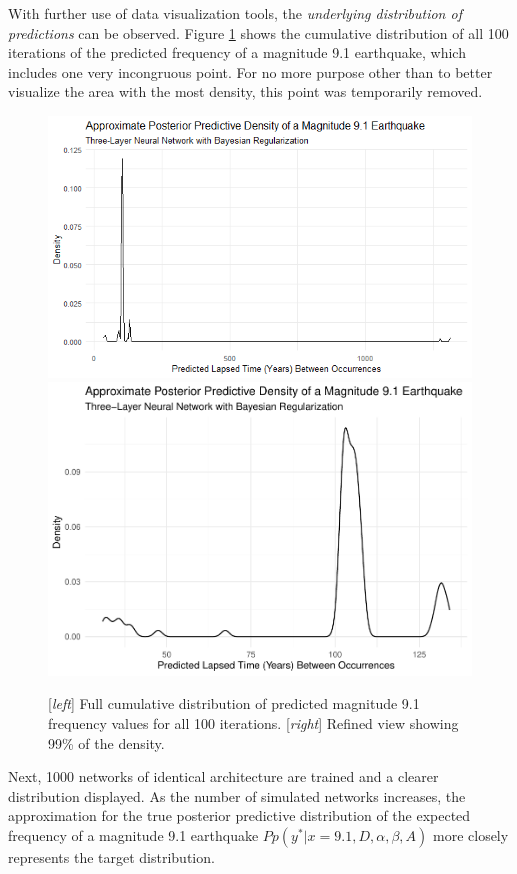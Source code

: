With further use of data visualization tools, the \textit{underlying distribution of predictions} can be observed.  Figure \ref{tohoku_ppd_100} shows the cumulative distribution of all 100 iterations of the predicted frequency of a magnitude 9.1 earthquake, which includes one very incongruous point.  For no more purpose other than to better visualize the area with the most density, this point was temporarily removed.

\begin{figure}[H]
    \includegraphics[width=0.5\linewidth]{Figures/tohoku_ppd_full.png}
    \includegraphics[width=0.5\linewidth]{earthquakes_files/figure-latex/unnamed-chunk-14-2.pdf}
    \caption{\footnotesize{[\textit{left}] Full cumulative distribution of predicted magnitude 9.1 frequency values for all 100 iterations. [\textit{right}] Refined view showing 99\% of the density.}}
    \label{tohoku_ppd_100}
\end{figure}

Next, 1000 networks of identical architecture are trained and a clearer distribution displayed.  As the number of simulated networks increases, the approximation for the true posterior predictive distribution of the expected frequency of a magnitude 9.1 earthquake
$Pp(y^*|x=9.1,D,\alpha,\beta,A)$
more closely represents the target distribution.


